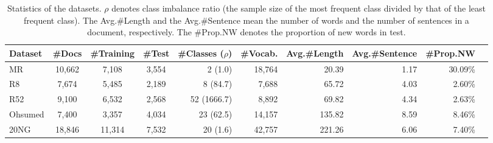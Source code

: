 \documentclass[letterpaper]{article} %
\begin{document}
\begin{table}[t]
\centering
\begin{tabular}{l|cccrrrrrr}
\toprule
Dataset & \#Docs & \#Training & \#Test & \#Classes ($\rho$) & \#Vocab. & Avg.\#Length & Avg.\#Sentence & \#Prop.NW\\ \midrule\midrule
MR      & 10,662 & 7,108 & 3,554 & 2 (1.0)  & 18,764  & 20.39  & 1.17 & 30.09\%   \\
R8      & 7,674   & 5,485     & 2,189 & 8 (84.7)  & 7,688   & 65.72 &  4.03 & 2.60\%  \\
R52     & 9,100     & 6,532 & 2,568 & 52 (1666.7) & 8,892   & 69.82   &  4.34 & 2.63\% \\
Ohsumed & 7,400       & 3,357     & 4,034     & 23 (62.5) & 14,157  & 135.82 & 8.59 & 8.46\%  \\
20NG    & 18,846   & 11,314    & 7,532     & 20 (1.6) & 42,757  & 221.26 & 6.06 & 7.40\%   \\ \bottomrule
\end{tabular}
\caption{Statistics  of the datasets. $\rho$ denotes class imbalance ratio (the sample size of the most frequent class divided by that of the least frequent class). The Avg.\#Length and the Avg.\#Sentence mean the number of words and the number of sentences in a document, respectively. The \#Prop.NW denotes the proportion of new words in test.}
\label{table1}
\end{table}
\end{document}
